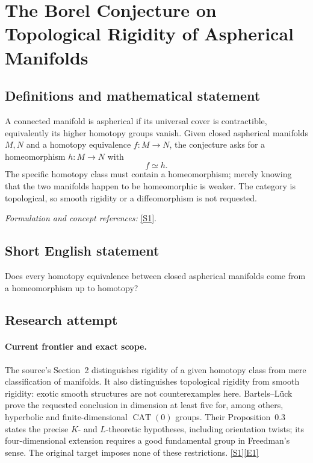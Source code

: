 \documentclass[11pt,a4paper]{article}
\newcommand{\sref}[2]{\hyperlink{source:#1:#2}{[S#2]}}
\newcommand{\eref}[2]{\hyperlink{extra:#1:#2}{[E#2]}}
\newif\ifshowcatalogue
\newcommand{\cataloguescope}[1]{\ifshowcatalogue
 \paragraph{Exact scope in the supplied catalogue.}
 \begin{quote}\small #1\end{quote}\fi}
\numberwithin{equation}{section}
\begin{document}
\setcounter{section}{0}
\clearpage
\section*{\texorpdfstring{The Borel Conjecture on Topological Rigidity of Aspherical Manifolds}{The Borel Conjecture on Topological Rigidity of Aspherical Manifolds}}\label{30006734}
\subsection{Definitions and mathematical statement}
A connected manifold is aspherical if its universal cover is contractible, equivalently its higher homotopy groups vanish. Given closed aspherical manifolds $M,N$ and a homotopy equivalence $f:M\to N$, the conjecture asks for a homeomorphism $h:M\to N$ with
\[
 f\simeq h.
\]
The specific homotopy class must contain a homeomorphism; merely knowing that the two manifolds happen to be homeomorphic is weaker. The category is topological, so smooth rigidity or a diffeomorphism is not requested.
\par\smallskip\textit{Formulation and concept references:} \sref{30006734}{1}.
\cataloguescope{Prove that every homotopy equivalence between closed aspherical manifolds is homotopic to a homeomorphism.}
\subsection{Short English statement}
Does every homotopy equivalence between closed aspherical manifolds come from a homeomorphism up to homotopy?
\subsection{Research attempt}

\paragraph{Current frontier and exact scope.}
The source's Section~2 distinguishes rigidity of a given homotopy class
from mere classification of manifolds. It also distinguishes topological
rigidity from smooth rigidity: exotic smooth structures are not
counterexamples here. Bartels--L\"uck prove the requested conclusion in
dimension at least five for, among others, hyperbolic and finite-dimensional
$\operatorname{CAT}(0)$ groups. Their Proposition~0.3 states the precise
$K$- and $L$-theoretic hypotheses, including orientation twists; its
four-dimensional extension requires a good fundamental group in
Freedman's sense. The original target imposes none of these restrictions.
\sref{30006734}{1}\eref{30006734}{1}
\end{document}
